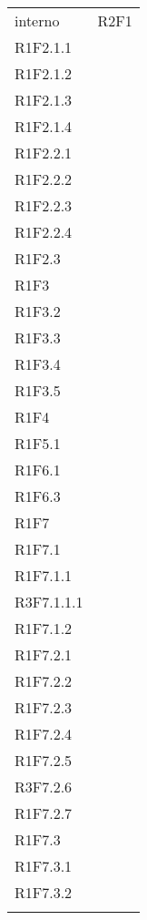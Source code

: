 \begin{longtable}{ >{\centering}p{}
		>{\centering}p{}}
	\tabularnewline
	interno & R2F1 \\ R1F2.1.1 \\R1F2.1.2 \\R1F2.1.3 \\R1F2.1.4 \\R1F2.2.1 \\R1F2.2.2 \\R1F2.2.3 \\R1F2.2.4 \\R1F2.3 \\R1F3 \\R1F3.2 \\R1F3.3 \\R1F3.4 \\R1F3.5 \\R1F4 \\R1F5.1 \\R1F6.1 \\R1F6.3 \\R1F7 \\R1F7.1 \\R1F7.1.1 \\R3F7.1.1.1 \\R1F7.1.2 \\R1F7.2.1 \\R1F7.2.2 \\R1F7.2.3 \\R1F7.2.4 \\R1F7.2.5 \\R3F7.2.6 \\R1F7.2.7 \\R1F7.3 \\R1F7.3.1 \\R1F7.3.2 \tabularnewline \rowcolorlight &	\tabularnewline
		

\end{longtable}
